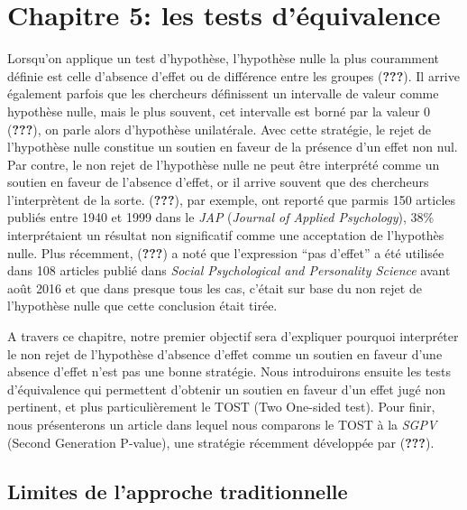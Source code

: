 \documentclass[
  english,
  man]{apa6}
\author{\phantom{0}}
\date{}
\affiliation{\phantom{0}}
\begin{document}
\hypertarget{chapitre-5-les-tests-duxe9quivalence}{%
\section{Chapitre 5: les tests d'équivalence}\label{chapitre-5-les-tests-duxe9quivalence}}

Lorsqu'on applique un test d'hypothèse, l'hypothèse nulle la plus couramment définie est celle d'absence d'effet ou de différence entre les groupes ({\textbf{???}}). Il arrive également parfois que les chercheurs définissent un intervalle de valeur comme hypothèse nulle, mais le plus souvent, cet intervalle est borné par la valeur 0 ({\textbf{???}}), on parle alors d'hypothèse unilatérale. Avec cette stratégie, le rejet de l'hypothèse nulle constitue un soutien en faveur de la présence d'un effet non nul. Par contre, le non rejet de l'hypothèse nulle ne peut être interprété comme un soutien en faveur de l'absence d'effet, or il arrive souvent que des chercheurs l'interprètent de la sorte. ({\textbf{???}}), par exemple, ont reporté que parmis 150 articles publiés entre 1940 et 1999 dans le \emph{JAP} (\emph{Journal of Applied Psychology}), 38\% interprétaient un résultat non significatif comme une acceptation de l'hypothès nulle. Plus récemment, ({\textbf{???}}) a noté que l'expression \enquote{pas d'effet} a été utilisée dans 108 articles publié dans \emph{Social Psychological and Personality Science} avant août 2016 et que dans presque tous les cas, c'était sur base du non rejet de l'hypothèse nulle que cette conclusion était tirée.

A travers ce chapitre, notre premier objectif sera d'expliquer pourquoi interpréter le non rejet de l'hypothèse d'absence d'effet comme un soutien en faveur d'une absence d'effet n'est pas une bonne stratégie. Nous introduirons ensuite les tests d'équivalence qui permettent d'obtenir un soutien en faveur d'un effet jugé non pertinent, et plus particulièrement le TOST (Two One-sided test). Pour finir, nous présenterons un article dans lequel nous comparons le TOST à la \emph{SGPV} (Second Generation P-value), une stratégie récemment développée par ({\textbf{???}}).

\hypertarget{limites-de-lapproche-traditionnelle}{%
\subsection{Limites de l'approche traditionnelle}\label{limites-de-lapproche-traditionnelle}}
\end{document}
